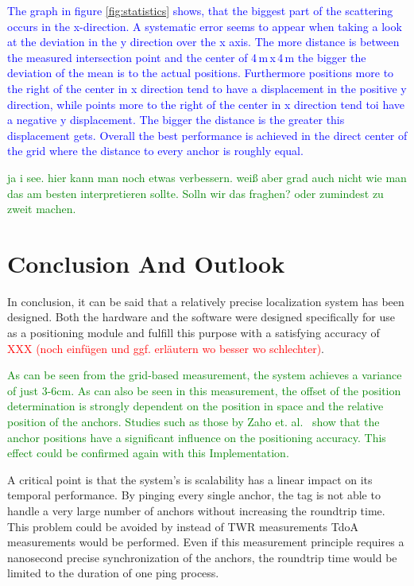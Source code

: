 \documentclass[conference, a4paper]{IEEEtran}
\begin{document}
\textcolor{blue}{
The graph in figure \ref{fig:statistics} shows, that the biggest part of the scattering occurs in the x-direction. 
A systematic error seems to appear when taking a look at the deviation in the y direction over the x axis. 
The more distance is between the measured intersection point and the center of 4\,m\,x\,4\,m the bigger the deviation of the mean is to the actual positions. 
Furthermore positions more to the right of the center in x direction tend to have a displacement in the positive y direction, while points more to the right of the center in x direction tend toi have a negative y displacement. 
The bigger the distance is the greater this displacement gets. 
Overall the best performance is achieved in the direct center of the grid where the distance to every anchor is roughly equal.
}

\textcolor{green}{ja i see. hier kann man noch etwas verbessern. weiß aber grad auch nicht wie man das am besten interpretieren sollte. Solln wir das fraghen? oder zumindest zu zweit machen.}


\section{Conclusion And Outlook}\label{section:conclusion}
In conclusion, it can be said that a relatively precise localization system has been designed.
Both the hardware and the software were designed specifically for use as a positioning module and fulfill this purpose with a satisfying accuracy of \textcolor{red}{XXX (noch einfügen und ggf. erläutern wo besser wo schlechter)}.

\textcolor{green}{
	As can be seen from the grid-based measurement, the system achieves a variance of just 3-6cm.
	As can also be seen in this measurement,
	the offset of the position determination is strongly dependent on the position in space
	and the relative position of the anchors.
	Studies such as those by Zaho et. al.~\cite{Zhao_2022} show that the anchor positions
	have a significant influence on the positioning accuracy.
	This effect could be confirmed again with this Implementation.
}

A critical point is that the system's is scalability has a linear impact on its temporal performance.
By pinging every single anchor, the tag is not able to handle a very large number of anchors without increasing the roundtrip time.
This problem could be avoided by instead of \ac{TWR} measurements \ac{TdoA} measurements would be performed.
Even if this measurement principle requires a nanosecond precise synchronization of the anchors,
the roundtrip time would be limited to the duration of one ping process.
\end{document}
